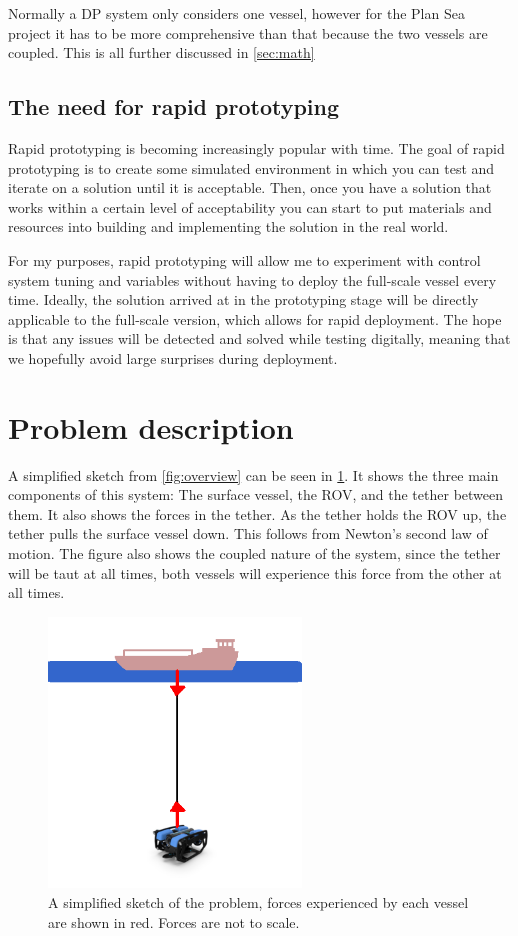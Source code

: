 \documentclass[class=article, crop=false]{standalone}
\begin{document}
Normally a DP system only considers one vessel, however for the Plan Sea project it has to be more comprehensive than that because the two vessels are coupled. This is all further discussed in \cref{sec:math}

\subsection{The need for rapid prototyping}
Rapid prototyping is becoming increasingly popular with time. The goal of rapid prototyping is to create some simulated environment in which you can test and iterate on a solution until it is acceptable. Then, once you have a solution that works within a certain level of acceptability you can start to put materials and resources into building and implementing the solution in the real world. 

For my purposes, rapid prototyping will allow me to experiment with control system tuning and variables without having to deploy the full-scale vessel every time. Ideally, the solution arrived at in the prototyping stage will be directly applicable to the full-scale version, which allows for rapid deployment. The hope is that any issues will be detected and solved while testing digitally, meaning that we hopefully avoid large surprises during deployment. 

\section{Problem description}
A simplified sketch from \cref{fig:overview} can be seen in \cref{fig:simple}. It shows the three main components of this system: The surface vessel, the ROV, and the tether between them. It also shows the forces in the tether. As the tether holds the ROV up, the tether pulls the surface vessel down. This follows from Newton's second law of motion. The figure also shows the coupled nature of the system, since the tether will be taut at all times, both vessels will experience this force from the other at all times.

\begin{figure}
	\centering
	\includegraphics[width=0.6\textwidth]{simplified-overview}
	\caption{A simplified sketch of the problem, forces experienced by each vessel are shown in red. Forces are not to scale.}
	\label{fig:simple}
\end{figure}
\end{document}
